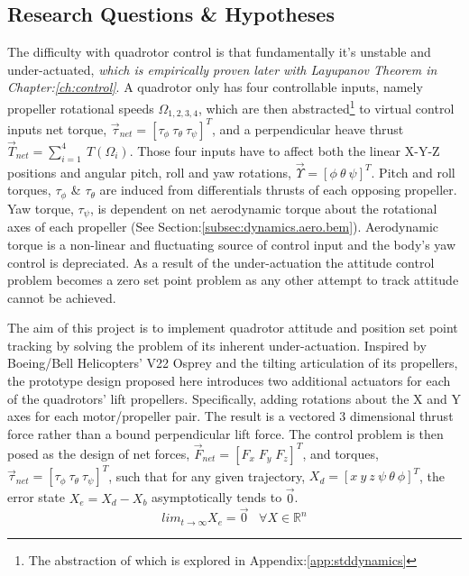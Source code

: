 \subsection{Research Questions \& Hypotheses}
\label{subsec:intro.foreword.hypotheses}
The difficulty with quadrotor control is that fundamentally it's unstable and under-actuated, \emph{which is empirically proven later with Layupanov Theorem in Chapter:\ref{ch:control}}. A quadrotor only has four controllable inputs, namely propeller rotational speeds $\Omega_{1,2,3,4}$, which are then abstracted\footnote{The abstraction of which is explored in Appendix:\ref{app:stddynamics}} to virtual control inputs net torque, $\vec{\tau}_{net}=[\tau_{\phi}~\tau_{\theta}~\tau_{\psi}]^T$, and a perpendicular heave thrust $\vec{T}_{net}=\sum_{i=1}^{4}~T(\Omega_i)$. Those four inputs have to affect both the linear X-Y-Z positions and angular pitch, roll and yaw rotations, $\vec{\Upsilon}=[\phi~\theta~\psi]^T$. Pitch and roll torques, $\tau_{\phi}$ \& $\tau_{\theta}$ are induced from differentials thrusts of each opposing propeller. Yaw torque, $\tau_{\psi}$, is dependent on net aerodynamic torque about the rotational axes of each propeller (See Section:\ref{subsec:dynamics.aero.bem}). Aerodynamic torque is a non-linear and fluctuating source of control input and the body's yaw control is depreciated. As a result of the under-actuation the attitude control problem becomes a zero set point problem as any other attempt to track attitude cannot be achieved.
\par
The aim of this project is to implement quadrotor attitude and position set point tracking by solving the problem of its inherent under-actuation. Inspired by Boeing/Bell Helicopters' V22 Osprey and the tilting articulation of its propellers, the prototype design proposed here introduces two additional actuators for each of the quadrotors' lift propellers. Specifically, adding rotations about the X and Y axes for each motor/propeller pair. The result is a vectored 3 dimensional thrust force rather than a bound perpendicular lift force. The control problem is then posed as the design of net forces, $\vec{F}_{net} = [F_x\;F_y\;F_z]^T$, and torques, $\vec{\tau}_{net} = [\tau_{\phi}~\tau_{\theta}~\tau_{\psi}]^T$, such that for any given trajectory, $X_d=[x~y~z~\psi~\theta~\phi]^T$, the error state $X_e = X_d - X_b$ asymptotically tends to $\vec{0}$.
\begin{equation} \label{eq:trajectoryerror}
lim_{t \rightarrow \infty} X_e = \vec{0}\hspace{10pt}\forall X \in \mathbb{R}^n
\end{equation}
